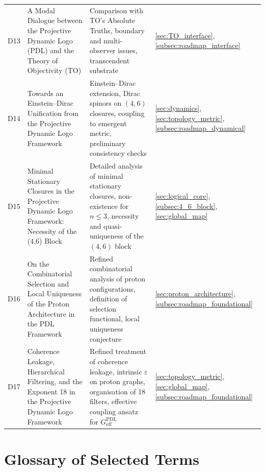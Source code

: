 \documentclass{article}
\newcommand{\PDL}{\mathrm{PDL}}
\begin{document}
\begin{longtable}{@{}p{0.9cm}L{5cm}L{5cm}p{4.4cm}@{}}
  D13 &
  A Modal Dialogue between the Projective Dynamic Logo (PDL) and the Theory of Objectivity (TO) &
  Comparison with TO's Absolute Truths, boundary and multi-observer issues, transcendent substrate &
  \ref{sec:TO_interface}, \ref{subsec:roadmap_interface} \\[0.4em]

  D14 &
  Towards an Einstein--Dirac Unification from the Projective Dynamic Logo Framework &
  Einstein–Dirac extension, Dirac spinors on $(4,6)$ closures, coupling to emergent metric, preliminary consistency checks &
  \ref{sec:dynamics}, \ref{sec:topology_metric}, \ref{subsec:roadmap_dynamical} \\[0.4em]

  D15 &
  Minimal Stationary Closures in the Projective Dynamic Logo Framework: Necessity of the (4,6) Block &
  Detailed analysis of minimal stationary closures, non-existence for $n \leq 3$, necessity and quasi-uniqueness of the $(4,6)$ block &
  \ref{sec:logical_core}, \ref{subsec:4_6_block}, \ref{sec:global_map} \\[0.4em]

  D16 &
  On the Combinatorial Selection and Local Uniqueness of the Proton Architecture in the PDL Framework &
  Refined combinatorial analysis of proton configurations, definition of selection functional, local uniqueness conjecture &
  \ref{sec:proton_architecture}, \ref{subsec:roadmap_foundational} \\[0.4em]

  D17 &
  Coherence Leakage, Hierarchical Filtering, and the Exponent 18 in the Projective Dynamic Logo Framework &
  Refined treatment of coherence leakage, intrinsic $\varepsilon$ on proton graphs, organisation of 18 filters, effective coupling ansatz for $G_{\mathrm{eff}}^{\PDL}$ &
  \ref{sec:topology_metric}, \ref{sec:global_map}, \ref{subsec:roadmap_foundational} \\[0.4em]

\end{longtable}

\newpage

\section{Glossary of Selected Terms}
\label{app:glossary}
\end{document}
